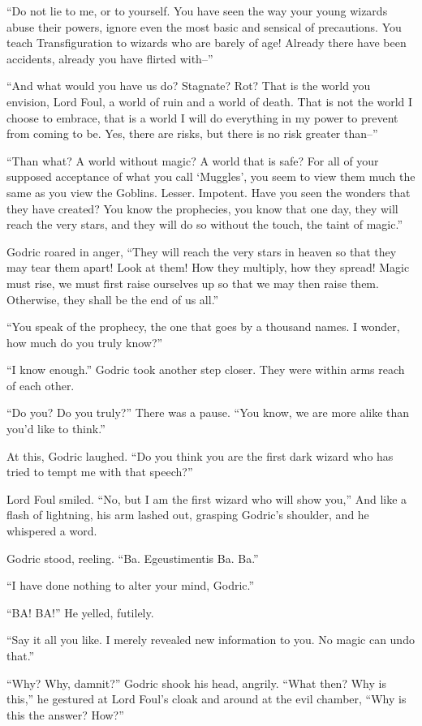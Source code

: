 “Do not lie to me, or to yourself. You have seen the way your young wizards abuse their powers, ignore even the most basic and sensical of precautions. You teach Transfiguration to wizards who are barely of age! Already there have been accidents, already you have flirted with–”

“And what would you have us do? Stagnate? Rot? That is the world you envision, Lord Foul, a world of ruin and a world of death. That is not the world I choose to embrace, that is a world I will do everything in my power to prevent from coming to be. Yes, there are risks, but there is no risk greater than–”

“Than what? A world without magic? A world that is safe? For all of your supposed acceptance of what you call ‘Muggles’, you seem to view them much the same as you view the Goblins. Lesser. Impotent. Have you seen the wonders that they have created? You know the prophecies, you know that one day, they will reach the very stars, and they will do so without the touch, the taint of magic.”

Godric roared in anger, “They will reach the very stars in heaven so that they may tear them apart! Look at them! How they multiply, how they spread! Magic must rise, we must first raise ourselves up so that we may then raise them. Otherwise, they shall be the end of us all.”

“You speak of the prophecy, the one that goes by a thousand names. I wonder, how much do you truly know?”

“I know enough.” Godric took another step closer. They were within arms reach of each other.

“Do you? Do you truly?” There was a pause. “You know, we are more alike than you’d like to think.”

At this, Godric laughed. “Do you think you are the first dark wizard who has tried to tempt me with that speech?”

Lord Foul smiled. “No, but I am the first wizard who will show you,” And like a flash of lightning, his arm lashed out, grasping Godric’s shoulder, and he whispered a word.

Godric stood, reeling. “Ba. Egeustimentis Ba. Ba.”

“I have done nothing to alter your mind, Godric.”

“BA! BA!” He yelled, futilely.

“Say it all you like. I merely revealed new information to you. No magic can undo that.”

“Why? Why, damnit?” Godric shook his head, angrily. “What then? Why is this,” he gestured at Lord Foul’s cloak and around at the evil chamber, “Why is this the answer? How?”

